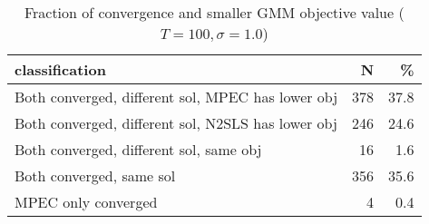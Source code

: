\begin{table}

\caption{\label{tab:unnamed-chunk-14}Fraction of convergence and smaller GMM objective value ($T=100,\sigma=1.0$)}
\centering
\begin{tabular}[t]{lrr}
\toprule
classification & N & \%\\
\midrule
Both converged, different sol, MPEC has lower obj & 378 & 37.8\\
Both converged, different sol, N2SLS has lower obj & 246 & 24.6\\
Both converged, different sol, same obj & 16 & 1.6\\
Both converged, same sol & 356 & 35.6\\
MPEC only converged & 4 & 0.4\\
\bottomrule
\end{tabular}
\end{table}
